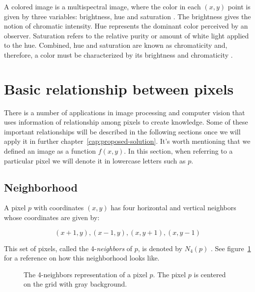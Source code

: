 A colored image is a multispectral image, where the color in each $(x, y)$ point is given by three variables: brightness, hue and saturation \citep{pedrini:08}. The brightness gives the notion of chromatic intensity. Hue represents the dominant color perceived by an observer. Saturation refers to the relative purity or amount of white light applied to the hue. Combined, hue and saturation are known as chromaticity and, therefore, a color must be characterized by its brightness and chromaticity \citep{gonzalez:02}.


\section{Basic relationship between pixels}
\label{sec:image_components_relation}
There is a number of applications in image processing and computer vision that uses information of relationship among pixels to create knowledge. Some of these important relationships will be described in the following sections once we will apply it in further chapter~\ref{cap:proposed-solution}. It's worth mentioning that we defined an image as a function $f(x, y)$. In this section, when referring to a particular pixel we will denote it in lowercase letters such as $p$.



\subsection{Neighborhood}
\label{sec:neighborhood}
A pixel $p$ with coordinates $(x, y)$ has four horizontal and vertical neighbors whose coordinates are given by:

\begin{equation*}
    (x + 1, y), (x - 1, y), (x, y + 1), (x, y - 1)
    \label{eq:n4_neighbors}
\end{equation*}

This set of pixels, called the 4-\textit{neighbors} of $p$, is denoted by $N_4(p)$ \citep{gonzalez:02}. See figure~\ref{fig:n4-neighbors} for a reference on how this neighborhood looks like.

\begin{figure}[ht]
    \centering

    \caption[The 4-neighbors representation of a pixel $p$]{The 4-neighbors representation of a pixel $p$. The pixel $p$ is centered on the grid with gray background.}
    \label{fig:n4-neighbors}
\end{figure}

